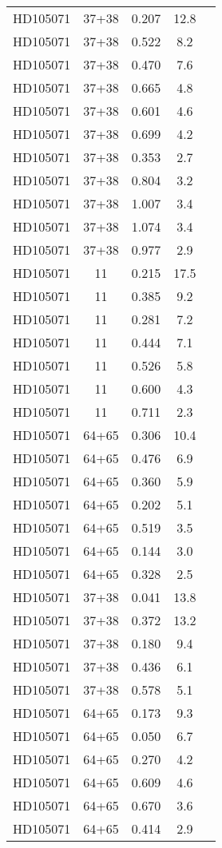 \begin{table*}
\begin{tabular}{l c c c c}
HD105071 & 37+38 & 0.207 & 12.8\\ 
HD105071 & 37+38 & 0.522 & 8.2\\ 
HD105071 & 37+38 & 0.470 & 7.6\\ 
HD105071 & 37+38 & 0.665 & 4.8\\ 
HD105071 & 37+38 & 0.601 & 4.6\\ 
HD105071 & 37+38 & 0.699 & 4.2\\ 
HD105071 & 37+38 & 0.353 & 2.7\\ 
HD105071 & 37+38 & 0.804 & 3.2\\ 
HD105071 & 37+38 & 1.007 & 3.4\\ 
HD105071 & 37+38 & 1.074 & 3.4\\ 
HD105071 & 37+38 & 0.977 & 2.9\\ 
HD105071 & 11 & 0.215 & 17.5\\ 
HD105071 & 11 & 0.385 & 9.2\\ 
HD105071 & 11 & 0.281 & 7.2\\ 
HD105071 & 11 & 0.444 & 7.1\\ 
HD105071 & 11 & 0.526 & 5.8\\ 
HD105071 & 11 & 0.600 & 4.3\\ 
HD105071 & 11 & 0.711 & 2.3\\ 
HD105071 & 64+65 & 0.306 & 10.4\\ 
HD105071 & 64+65 & 0.476 & 6.9\\ 
HD105071 & 64+65 & 0.360 & 5.9\\ 
HD105071 & 64+65 & 0.202 & 5.1\\ 
HD105071 & 64+65 & 0.519 & 3.5\\ 
HD105071 & 64+65 & 0.144 & 3.0\\ 
HD105071 & 64+65 & 0.328 & 2.5\\ 
HD105071 & 37+38 & 0.041 & 13.8\\ 
HD105071 & 37+38 & 0.372 & 13.2\\ 
HD105071 & 37+38 & 0.180 & 9.4\\ 
HD105071 & 37+38 & 0.436 & 6.1\\ 
HD105071 & 37+38 & 0.578 & 5.1\\ 
HD105071 & 64+65 & 0.173 & 9.3\\ 
HD105071 & 64+65 & 0.050 & 6.7\\ 
HD105071 & 64+65 & 0.270 & 4.2\\ 
HD105071 & 64+65 & 0.609 & 4.6\\ 
HD105071 & 64+65 & 0.670 & 3.6\\ 
HD105071 & 64+65 & 0.414 & 2.9\\ 

\end{tabular}
\end{table*}
